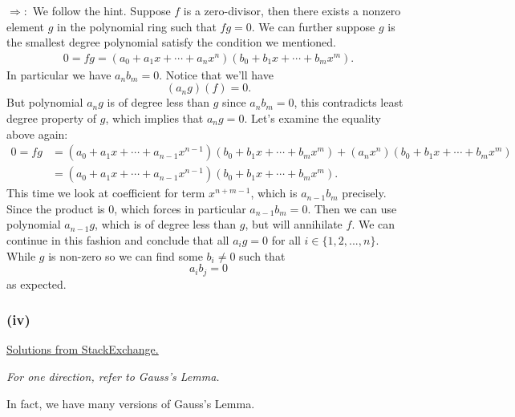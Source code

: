 $\Rightarrow:$ We follow the hint. Suppose $f$ is a zero-divisor, then there exists a nonzero element $g$ in the polynomial ring such that $fg=0$. We can further suppose $g$ is the smallest degree polynomial satisfy the condition we mentioned.
\begin{align*}
    0=fg=(a_0+a_1x+\cdots+a_nx^n)(b_0+b_1x+\cdots+b_mx^m).
\end{align*}In particular we have $a_nb_m=0$. Notice that we'll have 
$$(a_ng)(f)=0.$$ But polynomial $a_ng$ is of degree less than $g$ since $a_nb_m=0$, this contradicts least degree property of $g$, which implies that $a_ng=0$.
Let's examine the equality above again: \begin{align*}
    0=fg&=(a_0+a_1x+\cdots+a_{n-1}x^{n-1})(b_0+b_1x+\cdots+b_mx^m)+(a_nx^n)(b_0+b_1x+\cdots+b_mx^m)\\
    &=(a_0+a_1x+\cdots+a_{n-1}x^{n-1})(b_0+b_1x+\cdots+b_mx^m).
\end{align*}This time we look at coefficient for term $x^{n+m-1}$, which is $a_{n-1}b_m$ precisely. Since the product is $0$, which forces in particular $a_{n-1}b_m=0$. Then we can use polynomial $a_{n-1}g$, which is of degree less than $g$, but will annihilate $f$. We can continue in this fashion and conclude that all $a_ig=0$ for all $i\in \{1,2,...,n\}$. While $g$ is non-zero so we can find some $b_i\neq 0$ such that $$a_ib_j=0$$ as expected.

\subsubsection{(iv)}
\href{https://math.stackexchange.com/questions/688331/exercise-from-atiyah-macdonald-chapter-1-2-iv}{Solutions from StackExchange.}

\textit{For one direction, refer to Gauss's Lemma.}

In fact, we have many versions of Gauss's Lemma.



